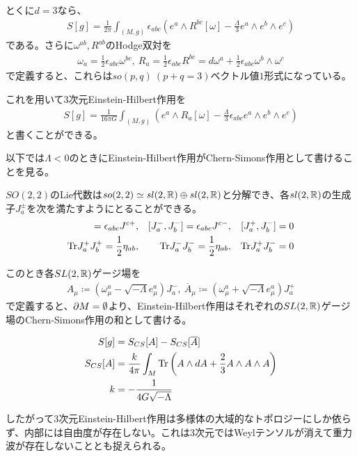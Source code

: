 とくに$d=3$なら、
\begin{align}
S[g]=\frac{1}{2\pi}\int_{(M,g)} \epsilon_{abc}(e^{a}\wedge R^{bc}[\omega]-\frac{\Lambda}{3}e^a\wedge e^b\wedge e^c)
\end{align}
である。さらに$\omega^{ab},R^{ab}$のHodge双対を
\begin{align}
\omega_a=\frac{1}{2}\epsilon_{abc}\omega^{bc},\ R_a=\frac{1}{2}\epsilon_{abc}R^{bc}=d\omega^a+\frac{1}{2}\epsilon_{abc}\omega^b\wedge \omega^c
\end{align}
で定義すると、これらは$so(p,q)\ (p+q=3)$ベクトル値$1$形式になっている。

これを用いて3次元Einstein-Hilbert作用を
\begin{align}
S[g]=\frac{1}{16\pi G}\int_{(M,g)} (e^{a}\wedge R_a[\omega]-\frac{\Lambda}{3}\epsilon_{abc} e^a\wedge e^b\wedge e^c)
\end{align}
と書くことができる。

以下では$\Lambda<0$のときにEinstein-Hilbert作用がChern-Simons作用として書けることを見る。

$SO(2,2)$のLie代数は$so(2,2)\simeq sl(2,\mathbb{R})\oplus sl(2,\mathbb{R})$と分解でき、各$sl(2,\mathbb{R})$の生成子$J_a^\pm$を次を満たすようにとることができる。
\begin{align}
[J_a^+,J_b^+]=\epsilon_{abc}J^{c+},&&[J_a^-,J_b^-]=\epsilon_{abc}J^{c-},&&[J_a^+,J_b^-]=0\\
\Tr J_a^+ J_b^+=\frac{1}{2}\eta_{ab},&&\Tr J_a^- J_b^-=\frac{1}{2}\eta_{ab},&&\Tr J_a^+ J_b^-=0
\end{align}


このとき各$SL(2,\mathbb{R})$ゲージ場を
\begin{align}
A_\mu\coloneqq \left(\omega_\mu^a-\sqrt{-\Lambda}e_\mu^a\right) J_a^-,\ \overline{A}_\mu\coloneqq \left(\omega_\mu^a+\sqrt{-\Lambda}e_\mu^a\right) J_a^+
\end{align}
で定義すると、$\partial M=\emptyset$より、Einstein-Hilbert作用はそれぞれの$SL(2,\mathbb{R})$ゲージ場のChern-Simons作用の和として書ける。
\begin{oframed}
\begin{align}
S[g]&=S_{CS}[A]-S_{CS}[\overline{A}]\\
S_{CS}[A]&=\frac{k}{4\pi}\int_M \text{Tr} \left( A\wedge dA+\frac{2}{3}A\wedge A\wedge A \right)\\
k&=-\frac{1}{4G\sqrt{-\Lambda}}
\end{align}
\end{oframed}

したがって3次元Einstein-Hilbert作用は多様体の大域的なトポロジーにしか依らず、内部には自由度が存在しない。これは3次元ではWeylテンソルが消えて重力波が存在しないこととも捉えられる。

